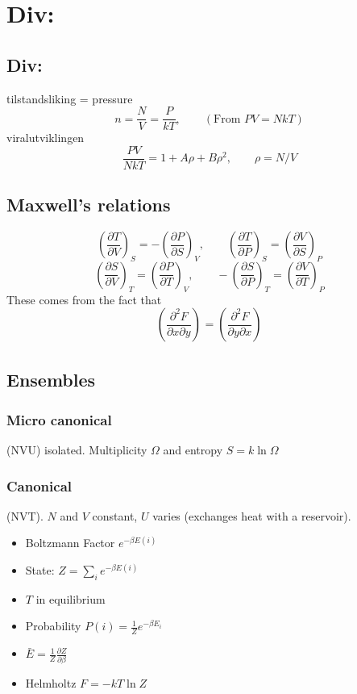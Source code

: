 \documentclass[a4paper,norsk, 10pt]{article}
\newcommand{\pd}[3]{\left(\frac{\partial #1}{\partial #2}\right)_{#3}}
\begin{document}
\section{Div:}
\subsection{Div:}
tilstandsliking = pressure
\begin{equation}
n = \frac{N}{V} = \frac{P}{kT},\qquad (\text{From }PV = NkT)
\end{equation}
viralutviklingen
\begin{equation}
\frac{PV}{NkT} = 1 + A \rho + B\rho^2, \qquad \rho = N/V
\end{equation}
\subsection{Maxwell's relations}
\begin{equation}
\pd{T}{V}{S} = -\pd{P}{S}{V}, \qquad \pd{T}{P}{S} = \pd{V}{S}{P}
\end{equation}
\begin{equation}
\pd{S}{V}{T} = \pd{P}{T}{V}, \qquad -\pd{S}{P}{T} = \pd{V}{T}{P}
\end{equation}
These comes from the fact that 
\begin{equation}
\pd{^2F}{x\partial y}{} = \pd{^2F}{y\partial x}{}
\end{equation}
\subsection{Ensembles}
\subsubsection{Micro canonical}
(NVU) isolated. Multiplicity $\Omega$ and entropy $S = k\ln\Omega$
\subsubsection{Canonical}
(NVT). $N$ and $V$ constant, $U$ varies (exchanges heat with a reservoir).
\begin{itemize}
\item Boltzmann Factor $e^{-\beta E(i)}$
\item State: $Z = \sum_i e^{-\beta E(i)}$
\item $T$ in equilibrium
\item Probability $P(i) = \frac{1}{Z}e^{-\beta E_i}$
\item $\bar{E} = \frac{1}{Z}\frac{\partial Z}{\partial \beta}$
\item Helmholtz $F = -kT\ln Z$
\end{itemize}
\end{document}
